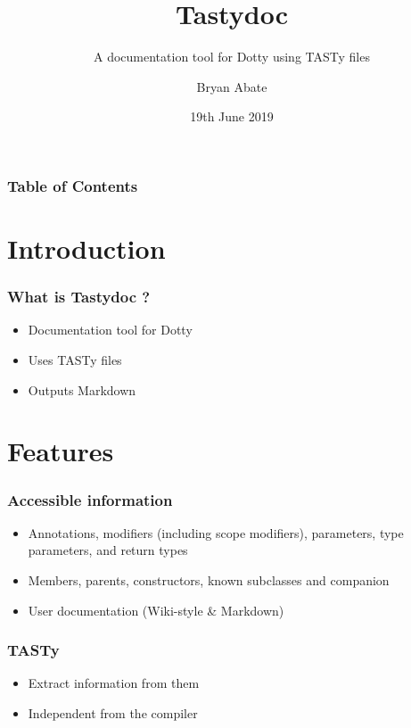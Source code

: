\documentclass{beamer}
\title{Tastydoc}
\subtitle{A documentation tool for Dotty using TASTy files}
\author{Bryan Abate}
\date{19th June 2019}
\begin{document}
 
\frame{\titlepage}

\begin{frame}
  \frametitle{Table of Contents}
  \tableofcontents
\end{frame}


\section{Introduction}

\begin{frame}
  \frametitle{What is Tastydoc ?}
  \pause
  \begin{itemize}
    \item Documentation tool for Dotty \pause
    \item Uses TASTy files \pause
    \item Outputs Markdown
  \end{itemize}
\end{frame}
 
\section{Features}

\begin{frame}
  \frametitle{Accessible information}
  \pause
  \begin{itemize}
    \item Annotations, modifiers (including scope modifiers), parameters, type parameters, and return types \pause
    \item Members, parents, constructors, known subclasses and companion \pause
    \item User documentation (Wiki-style \& Markdown)
  \end{itemize}
\end{frame}

\begin{frame}
  \frametitle{TASTy}
  \pause
  \begin{itemize}
    \item Extract information from them \pause
    \item Independent from the compiler
  \end{itemize}
\end{frame}
\end{document}
